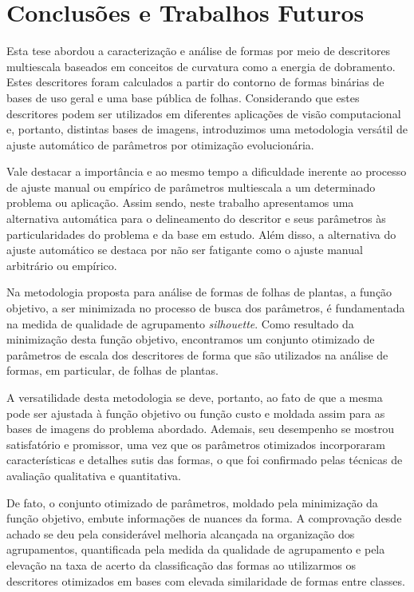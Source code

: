\chapter{Conclusões e Trabalhos Futuros \label{chap:ch5}}

Esta tese abordou a caracterização e análise de formas por meio de descritores multiescala baseados em conceitos de curvatura como a energia de dobramento. Estes descritores foram calculados a partir do contorno de formas binárias de bases de uso geral e uma base pública de folhas. Considerando que estes descritores podem ser utilizados em diferentes aplicações de visão computacional e,  portanto, distintas bases de imagens, introduzimos uma metodologia versátil de ajuste automático de parâmetros por otimização evolucionária. 

Vale destacar a importância e ao mesmo tempo a dificuldade inerente ao processo de ajuste manual ou empírico de parâmetros multiescala a um determinado problema ou aplicação. Assim sendo, neste trabalho apresentamos uma alternativa automática para o delineamento do descritor e seus parâmetros às particularidades do problema e da base em estudo.  
Além disso, a alternativa do ajuste automático se destaca por não ser fatigante como o ajuste manual arbitrário ou empírico.

Na metodologia proposta para análise de formas de folhas de plantas, a função objetivo, a ser minimizada no processo de busca dos parâmetros, é fundamentada na medida de qualidade de agrupamento \textit{silhouette}. Como resultado da minimização desta função objetivo, encontramos um conjunto otimizado de parâmetros de escala dos descritores de forma que são utilizados na análise de formas, em particular, de folhas de plantas.  

A versatilidade desta metodologia se deve, portanto, ao fato de que a mesma pode ser ajustada à função  objetivo ou função custo e moldada assim para as bases de imagens do problema abordado. Ademais, seu desempenho se mostrou satisfatório e promissor, uma vez que os parâmetros otimizados incorporaram características e detalhes sutis das formas, o que foi confirmado pelas técnicas de avaliação qualitativa e quantitativa. 

De fato, o conjunto otimizado de parâmetros, moldado pela minimização da função objetivo,  embute informações de nuances da forma. A comprovação desde achado se deu pela considerável melhoria alcançada na organização dos agrupamentos, quantificada pela medida da qualidade de agrupamento e pela elevação na taxa de acerto da classificação das formas ao utilizarmos os descritores otimizados em bases com elevada similaridade de formas entre classes. 

